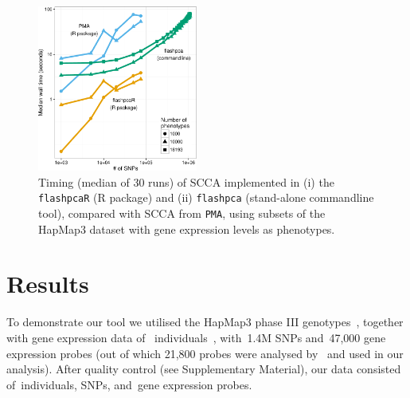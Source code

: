 \documentclass{bioinfo}
\begin{document}
\begin{figure}[!tpb]
\centerline{\includegraphics[width=0.47\textwidth]{scca_timing-crop.pdf}}
\caption{
Timing (median of 30 runs) of SCCA implemented in (i) the \texttt{flashpcaR}
(\textsf{R} package) and (ii) \texttt{flashpca} (stand-alone commandline tool),
compared with SCCA from \texttt{PMA}, using subsets of the HapMap3 dataset with gene
expression levels as phenotypes.
}
\label{fig:01}
\end{figure}

\section{Results}

To demonstrate our tool we utilised the HapMap3 phase III
genotypes~\citep{hapmap2010}, together with gene expression data of~\nindiv
individuals~\citep{Stranger2012}, with~1.4M SNPs and~47,000 gene expression
probes (out of which 21,800 probes were analysed by~\citet{Stranger2012} and
used in our analysis). After quality control (see Supplementary Material),
our data consisted of~\nindiv individuals, \nsnps SNPs, and~\ngenes gene
expression probes.
\end{document}
